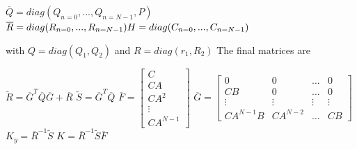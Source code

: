 \documentclass[a4paper,twocolumn]{article}
\begin{document}
\begin{enumerate}[3.2]
        $\overline{Q}=diag(Q_{n=0},...,Q_{n=N-1},P) $ \newline $\overline{R}=diag(R_{n=0},...,R_{n=N-1})\\H=diag(C_{n=0},...,C_{n=N-1})$\newline

    with $Q=diag(Q_1,Q_2)$ and $R=diag(r_1,R_2)$ \newline
    The final matrices are \newline
  
        $\tilde{R}=\overline{G}^T\overline{Q}\overline{G}+\overline{R}$ \newline
        $\tilde{S}=\overline{G}^T\overline{Q} $ \newline
        $\overline{F}=
                \begin{bmatrix}
                C \\
                CA \\
                CA^2 \\
                \vdots \\
                CA^{N-1}
                \end{bmatrix}$ \newline
        $\overline{G}=
              \begin{bmatrix}
              0   &  0  &  \dots  &  0 \\
              CB  &  0  &  \dots  &  0 \\
              \vdots  &  \vdots  & \vdots &\vdots \\
              CA^{N-1}B & CA^{N-2} & \dots & CB
              \end{bmatrix}$\newline
        $K_y=\overline{R}^{-1}\tilde{S}$\newline
        $K=\overline{R}^{-1}\tilde{S}\overline{F}$
  
    
    
\end{enumerate}
\end{document}

